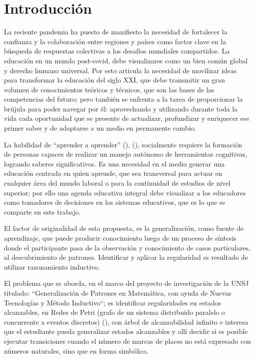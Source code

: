 \documentclass[oneside,spanish]{amsart}
\numberwithin{equation}{section}
\theoremstyle{definition}
\begin{document}
\maketitle
\thispagestyle{empty}

\section{Introducción}

La reciente pandemia ha puesto de manifiesto la necesidad de fortalecer la confianza y la colaboración entre regiones y países como factor clave en la búsqueda de respuestas colectivas a los desafíos mundiales compartidos. La educación en un mundo post-covid, debe visualizarse como un bien común global y derecho humano universal. Por esto articula la necesidad de movilizar ideas para transformar la educación del siglo XXI, que debe transmitir un gran volumen de conocimientos teóricos y técnicos, que son las bases de las competencias del futuro; pero también se enfrenta a la tarea de proporcionar la brújula para poder navegar por él: aprovechando y utilizando durante toda la vida cada oportunidad que se presente de actualizar, profundizar y enriquecer ese primer saber y de adaptarse a un medio en permanente cambio.

La habilidad de “aprender a aprender” (\citet{lluch18}), (\citet{meirieu92}), socialmente requiere la formación de personas capaces de realizar un manejo autónomo de herramientas cognitivas, logrando saberes significativos. Es una necesidad en el medio generar una educación centrada en quien aprende, que sea transversal para actuar en cualquier área del mundo laboral o para la continuidad de estudios de nivel superior; por ello una agenda educativa integral debe visualizar a los educadores como tomadores de decisiones en los sistemas educativos, que es lo que se comparte en este trabajo.

El factor de originalidad de esta propuesta, es la generalización, como fuente de aprendizaje, que puede producir conocimiento luego de un proceso de síntesis donde el participante pasa de la observación y conocimiento de casos particulares, al descubrimiento de patrones. Identificar y aplicar la regularidad es resultado de utilizar razonamiento inductivo.

El problema que se aborda, en el marco del proyecto de investigación de la UNSJ titulado: “Generalización de Patrones en Matemática, con ayuda de Nuevas Tecnologías y Método Inductivo“; es identificar regularidades en estados alcanzables, en Redes de Petri (grafo de un sistema distribuido paralelo o concurrente a eventos discretos) (\citet{johnsonbaugh00}), con árbol de alcanzabilidad infinito e interesa que el estudiante pueda generalizar estados alcanzables y allí decidir si es posible ejecutar transiciones cuando el número de marcas de places no está expresado con números naturales, sino que en forma simbólica.
\end{document}
